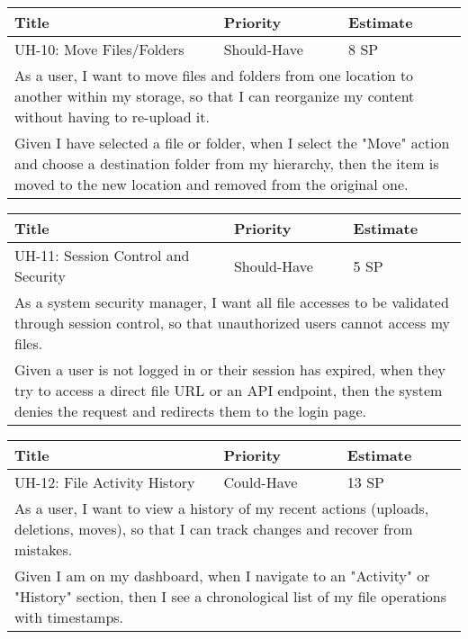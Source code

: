 \vspace{5mm}
\begin{tabular}{|p{4cm}|p{5cm}|p{5cm}|}
    \hline
    \textbf{Title} & \textbf{Priority} & \textbf{Estimate} \\
    \hline
    UH-10: Move Files/Folders & Should-Have & 8 SP \\
    \hline
    \multicolumn{3}{|p{14cm}|}{As a user, I want to move files and folders from one location to another within my storage, so that I can reorganize my content without having to re-upload it.} \\
    \hline
    \multicolumn{3}{|p{14cm}|}{Given I have selected a file or folder, when I select the "Move" action and choose a destination folder from my hierarchy, then the item is moved to the new location and removed from the original one.} \\
    \hline
\end{tabular}

\vspace{5mm}
\begin{tabular}{|p{4cm}|p{5cm}|p{5cm}|}
    \hline
    \textbf{Title} & \textbf{Priority} & \textbf{Estimate} \\
    \hline
    UH-11: Session Control and Security & Should-Have & 5 SP \\
    \hline
    \multicolumn{3}{|p{14cm}|}{As a system security manager, I want all file accesses to be validated through session control, so that unauthorized users cannot access my files.} \\
    \hline
    \multicolumn{3}{|p{14cm}|}{Given a user is not logged in or their session has expired, when they try to access a direct file URL or an API endpoint, then the system denies the request and redirects them to the login page.} \\
    \hline
\end{tabular}

\vspace{5mm}
\begin{tabular}{|p{4cm}|p{5cm}|p{5cm}|}
    \hline
    \textbf{Title} & \textbf{Priority} & \textbf{Estimate} \\
    \hline
    UH-12: File Activity History & Could-Have & 13 SP \\
    \hline
    \multicolumn{3}{|p{14cm}|}{As a user, I want to view a history of my recent actions (uploads, deletions, moves), so that I can track changes and recover from mistakes.} \\
    \hline
    \multicolumn{3}{|p{14cm}|}{Given I am on my dashboard, when I navigate to an "Activity" or "History" section, then I see a chronological list of my file operations with timestamps.} \\
    \hline
\end{tabular}

